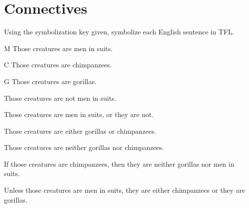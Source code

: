 


\chapter{Connectives}\setcounter{ProbPart}{0}
\problempart Using the symbolization key given, symbolize each English sentence in TFL.\label{pr.monkeysuits}
	\begin{ekey}
		\item[M] Those creatures are men in suits. 
		\item[C] Those creatures are chimpanzees. 
		\item[G] Those creatures are gorillas.
	\end{ekey}
\begin{earg}
\item Those creatures are not men in suits.
\item[] 
\item Those creatures are men in suits, or they are not.
\item[]  
\item Those creatures are either gorillas or chimpanzees.
\item[] 
\item Those creatures are neither gorillas nor chimpanzees.
\item[] 
\item If those creatures are chimpanzees, then they are neither gorillas nor men in suits.
\item[] 
\item Unless those creatures are men in suits, they are either chimpanzees or they are gorillas.
\item[] 
\end{earg}

